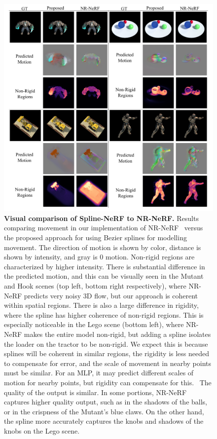 \begin{figure}
    \includegraphics[width=\textwidth]{compare}
    \caption{
        \label{fig:qual_cmp}
        \textbf{Visual comparison of Spline-NeRF to NR-NeRF.}
        Results comparing movement in our implementation of NR-NeRF~\cite{tretschk2021nonrigid} versus the proposed approach for using Bezier splines for modelling movement. The direction of motion is shown by color, distance is shown by intensity, and gray is 0 motion. Non-rigid regions are characterized by higher intensity. There is substantial difference in the predicted motion, and this can be visually seen in the Mutant and Hook scenes (top left, bottom right respectively), where NR-NeRF predicts very noisy 3D flow, but our approach is coherent within spatial regions. There is also a large difference in rigidity, where the spline has higher coherence of non-rigid regions. This is especially noticeable in the Lego scene (bottom left), where NR-NeRF makes the entire model non-rigid, but adding a spline isolates the loader on the tractor to be non-rigid. We expect this is because splines will be coherent in similar regions, the rigidity is less needed to compensate for error, and the scale of movement in nearby points must be similar. For an MLP, it may predict different scales of motion for nearby points, but rigidity can compensate for this.
        \
        The quality of the output is similar. In some portions, NR-NeRF captures higher quality output, such as in the shadows of the balls, or in the crispness of the Mutant's blue claws. On the other hand, the spline more accurately captures the knobs and shadows of the knobs on the Lego scene.
    }
\end{figure}

